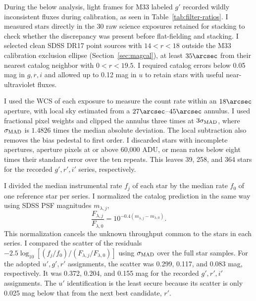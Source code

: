 During the below analysis, light frames for M33 labeled $g'$ recorded wildly inconsistent fluxes during calibration, as seen in Table~\ref{tab:filter-ratios}. I measured stars directly in the 30 raw science exposures retained for stacking to check whether the discrepancy was present before flat-fielding and stacking. I selected clean SDSS DR17 point sources with $14<r<18$ outside the M33 calibration exclusion ellipse (Section~\ref{sec:magcal}), at least $35\arcsec$ from their nearest catalog neighbor with $0<r<19.5$. I required catalog errors below 0.05 mag in $g,r,i$ and allowed up to 0.12 mag in $u$ to retain stars with useful near-ultraviolet fluxes. \citep{methDR17}

I used the WCS of each exposure to measure the count rate within an $18\arcsec$ aperture, with local sky estimated from a $27\arcsec$--$45\arcsec$ annulus. I used fractional pixel weights and clipped the annulus three times at $3\sigma_{\rm MAD}$, where $\sigma_{\rm MAD}$ is $1.4826$ times the median absolute deviation. The local subtraction also removes the bias pedestal to first order. I discarded stars with incomplete apertures, aperture pixels at or above 60,000 ADU, or mean rates below eight times their standard error over the ten repeats. This leaves 39, 258, and 364 stars for the recorded $g',r',i'$ series, respectively.

I divided the median instrumental rate $f_j$ of each star by the median rate $f_0$ of one reference star per series. I normalized the catalog prediction in the same way using SDSS PSF magnitudes $m_{\lambda,j}$,
\begin{equation}
    \frac{F_{\lambda,j}}{F_{\lambda,0}}
    =10^{-0.4(m_{\lambda,j}-m_{\lambda,0})}.
    \label{eq:filter-ratios}
\end{equation}
This normalization cancels the unknown throughput common to the stars in each series. I compared the scatter of the residuals $-2.5\log_{10}[(f_j/f_0)/(F_{\lambda,j}/F_{\lambda,0})]$ using $\sigma_{\rm MAD}$ over the full star samples. For the adopted $u',g',r'$ assignments, the scatter was 0.299, 0.117, and 0.083 mag, respectively. It was 0.372, 0.204, and 0.155 mag for the recorded $g',r',i'$ assignments. The $u'$ identification is the least secure because its scatter is only 0.025 mag below that from the next best candidate, $r'$.

